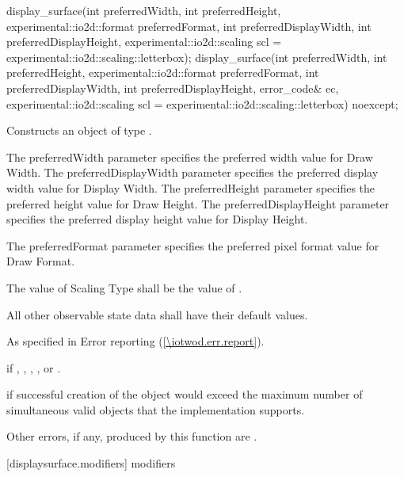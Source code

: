 \begin{itemdecl}
display_surface(int preferredWidth, int preferredHeight, 
  experimental::io2d::format preferredFormat,
  int preferredDisplayWidth, int preferredDisplayHeight,
  experimental::io2d::scaling scl = experimental::io2d::scaling::letterbox);
display_surface(int preferredWidth, int preferredHeight, 
  experimental::io2d::format preferredFormat,
  int preferredDisplayWidth, int preferredDisplayHeight, error_code& ec,
  experimental::io2d::scaling scl = experimental::io2d::scaling::letterbox) 
  noexcept;
\end{itemdecl}
\begin{itemdescr}
\pnum
\effects
Constructs an object of type .

\pnum
The preferredWidth parameter specifies the preferred width value for Draw Width. The preferredDisplayWidth parameter specifies the preferred display width value for Display Width. The preferredHeight parameter specifies the preferred height value for Draw Height. The preferredDisplayHeight parameter specifies the preferred display height value for Display Height.

\pnum
The preferredFormat parameter specifies the preferred pixel format value for Draw Format.

\pnum
The value of Scaling Type shall be the value of .

\pnum
All other observable state data shall have their default values.

\pnum
\throws
As specified in Error reporting (\ref{\iotwod.err.report}).

\pnum
\errors
{} if , , , , or .

 if successful creation of the  object would exceed the maximum number of simultaneous valid  objects that the implementation supports.

\pnum
Other errors, if any, produced by this function are .
\end{itemdescr}

 [displaysurface.modifiers]{ modifiers}

